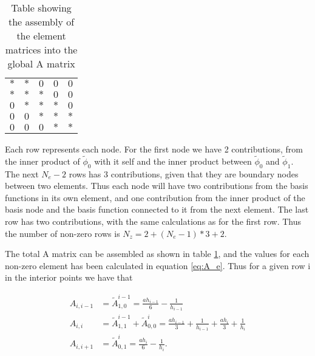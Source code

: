 \documentclass[norsk,a4paper,12pt]{scrartcl}
\begin{document}
\begin{table}[h]
\begin{tabular}{lllll}
\cline{1-2}
\multicolumn{1}{|l}{$*$}  & \multicolumn{1}{l|}{$*$} & $0$                      & $0$                      & $0$                      \\ \cline{2-3}
\multicolumn{1}{|l|}{$*$} & \multicolumn{1}{l|}{$*$} & \multicolumn{1}{l|}{$*$} & $0$                      & $0$                      \\ \cline{1-4}
\multicolumn{1}{l|}{$0$}  & \multicolumn{1}{l|}{$*$} & \multicolumn{1}{l|}{$*$} & \multicolumn{1}{l|}{$*$} & $0$                      \\ \cline{2-5} 
$0$                       & \multicolumn{1}{l|}{$0$} & \multicolumn{1}{l|}{$*$} & \multicolumn{1}{l|}{$*$} & \multicolumn{1}{l|}{$*$} \\ \cline{3-4}
$0$                       & $0$                      & \multicolumn{1}{l|}{$0$} & $*$                      & \multicolumn{1}{l|}{$*$} \\ \cline{4-5} 
\end{tabular}
\caption{Table showing the assembly of the element matrices into the global A matrix}
\label{tab:A}
\end{table}

Each row represents each node. For the first node we have 2 contributions, from the inner product of $\tilde{\phi}_0$ with it self and the inner product between $\tilde{\phi}_0$ and $\tilde{\phi}_1$. The next $N_e-2$ rows has 3 contributions, given that they are boundary nodes between two elements. Thus each node will have two contributions from the basis functions in its own element, and one contribution from the inner product of the basis node and the basis function connected to it from the next element. The last row has two contributions, with the same calculations as for the first row. Thus the number of non-zero rows is $N_z = 2 + (N_{e}-1)*3 + 2$.

The total A matrix can be assembled as shown in table \ref{tab:A}, and the values for each non-zero element has been calculated in equation \ref{eq:A_e}. Thus for a given row i in the interior points we have that 

\begin{equation}
\begin{aligned}
        A_{i,i-1} &= \tilde{A}_{1,0}^{i-1} = \frac{ah_{i-1}}{6} - \frac{1}{h_{i-1}}\\
        A_{i,i} &= \tilde{A}_{1,1}^{i-1} + \tilde{A}_{0,0}^{i} = \frac{ah_{i-1}}{3} + \frac{1}{h_{i-1}} + \frac{ah_{i}}{3} + \frac{1}{h_{i}}\\
        A_{i,i+1} &=\tilde{A}_{0,1}^{i} = \frac{ah_{i}}{6} - \frac{1}{h_{i}}.
\end{aligned}
\end{equation}
\end{document}
